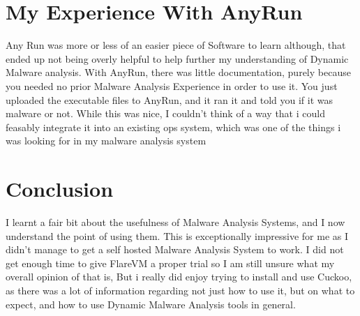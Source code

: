 \documentclass{article}
\begin{document}
\section*{My Experience With AnyRun}

Any Run was more or less of an easier piece of Software to learn although, 
that ended up not being overly helpful to help further my understanding of
Dynamic Malware analysis. With AnyRun, there was little documentation, purely
because you needed no prior Malware Analysis Experience in order to use it. 
You just uploaded the executable files to AnyRun, and it ran it and told you
if it was malware or not. While this was nice, I couldn't think of a way that
i could feasably integrate it into an existing ops system, which was one of the
things i was looking for in my malware analysis system


\section*{Conclusion}

I learnt a fair bit about the usefulness of Malware Analysis Systems, and I now
understand the point of using them. This is exceptionally impressive for me as
I didn't manage to get a self hosted Malware Analysis System to work. I did not
get enough time to give FlareVM a proper trial so I am still unsure what my 
overall opinion of that is, But i really did enjoy trying to install and use
Cuckoo, as there was a lot of information regarding not just how to use it, but
on what to expect, and how to use Dynamic Malware Analysis tools in general. 
\end{document}
